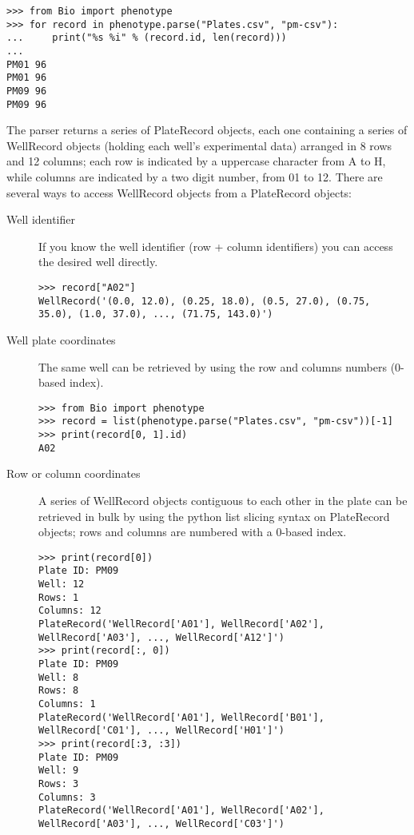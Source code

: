 \begin{verbatim}
>>> from Bio import phenotype
>>> for record in phenotype.parse("Plates.csv", "pm-csv"):
...     print("%s %i" % (record.id, len(record)))
...
PM01 96
PM01 96
PM09 96
PM09 96
\end{verbatim}

The parser returns a series of PlateRecord objects, each one containing a series of WellRecord objects
(holding each well's experimental data) arranged in 8 rows and 12 columns; each row is indicated by
a uppercase character from A to H, while columns are indicated by a two digit number, from 01 to 12.
There are several ways to access WellRecord objects from a PlateRecord objects:

\begin{description}
  \item[Well identifier]
    If you know the well identifier (row + column identifiers) you can access the desired well directly.
\begin{verbatim}
>>> record["A02"]
WellRecord('(0.0, 12.0), (0.25, 18.0), (0.5, 27.0), (0.75, 35.0), (1.0, 37.0), ..., (71.75, 143.0)')
\end{verbatim}

  \item[Well plate coordinates]
    The same well can be retrieved by using the row and columns numbers (0-based index).

\begin{verbatim}
>>> from Bio import phenotype
>>> record = list(phenotype.parse("Plates.csv", "pm-csv"))[-1]
>>> print(record[0, 1].id)
A02
\end{verbatim}

  \item[Row or column coordinates]
    A series of WellRecord objects contiguous to each other in the plate can be retrieved in bulk by
    using the python list slicing syntax on PlateRecord objects; rows and columns are numbered with
    a 0-based index.

\begin{verbatim}
>>> print(record[0])
Plate ID: PM09
Well: 12
Rows: 1
Columns: 12
PlateRecord('WellRecord['A01'], WellRecord['A02'], WellRecord['A03'], ..., WellRecord['A12']')
>>> print(record[:, 0])
Plate ID: PM09
Well: 8
Rows: 8
Columns: 1
PlateRecord('WellRecord['A01'], WellRecord['B01'], WellRecord['C01'], ..., WellRecord['H01']')
>>> print(record[:3, :3])
Plate ID: PM09
Well: 9
Rows: 3
Columns: 3
PlateRecord('WellRecord['A01'], WellRecord['A02'], WellRecord['A03'], ..., WellRecord['C03']')
\end{verbatim}

\end{description}

